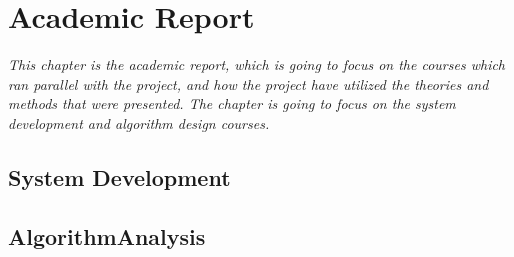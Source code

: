 \chapter{Academic Report}

\textit{This chapter is the academic report, which is going to focus on the courses which ran parallel with the project, and how the project have utilized the theories and methods that were presented. The chapter is going to focus on the system development and algorithm design courses.}

\section{System Development}
\label{SystemDev}

\section{AlgorithmAnalysis}
\label{AlgorithmAnalysis}
